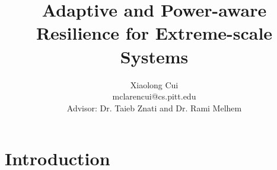 \documentclass[11pt]{article}
\title{Adaptive and Power-aware Resilience for Extreme-scale Systems}
\author
{Xiaolong Cui\\
\normalsize{mclarencui@cs.pitt.edu}\\
\normalsize{Advisor: Dr. Taieb Znati and Dr. Rami Melhem}\\
}
\date{}
\newenvironment{sciabstract}{%
\begin{quote} \bf}
{\end{quote}}
\begin{document}
 




\maketitle 








\section{Introduction}
\label{sec:intro}

\end{document}
